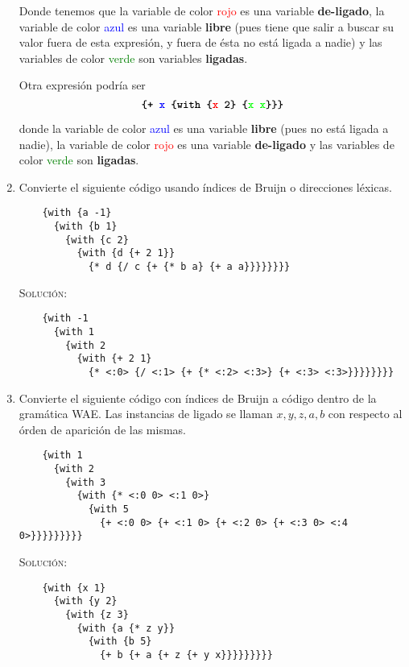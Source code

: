 \documentclass[letterpaper,11pt]{article}
\begin{document}
\begin{enumerate}
    Donde tenemos que la variable de color \textcolor{red}{rojo} es una variable 
    \textbf{de-ligado}, la variable de color \textcolor{blue}{azul} es una
    variable \textbf{libre} (pues tiene que salir a buscar su valor fuera de 
    esta expresión, y fuera de ésta no está ligada a nadie) y las variables de 
    color \textcolor{green}{verde} son  
    variables \textbf{ligadas}. 

    Otra expresión podría ser 
    \begin{equation*}
        \texttt{\textbf{\{+ \textcolor{blue}{x} 
                            \{with \{\textcolor{red}{x} 2\} 
                                   \{\textcolor{green}{x} 
                                     \textcolor{green}{x}\}\}\}}}
    \end{equation*}

    donde la variable de color \textcolor{blue}{azul} es una variable 
    \textbf{libre} (pues no está ligada a nadie), la variable de color 
    \textcolor{red}{rojo} es una variable \textbf{de-ligado} y las 
    variables de color \textcolor{green}{verde} son \textbf{ligadas}.

    \newpage
    \item Convierte el siguiente código usando índices de Bruijn o direcciones
    léxicas. 
    \begin{verbatim}
    {with {a -1} 
      {with {b 1} 
        {with {c 2} 
          {with {d {+ 2 1}} 
            {* d {/ c {+ {* b a} {+ a a}}}}}}}}
    \end{verbatim}

    \textsc{Solución:}
    \begin{verbatim}
    {with -1 
      {with 1 
        {with 2 
          {with {+ 2 1} 
            {* <:0> {/ <:1> {+ {* <:2> <:3>} {+ <:3> <:3>}}}}}}}}
    \end{verbatim}

    \item Convierte el siguiente código con índices de Bruijn a código dentro 
    de la gramática WAE. Las instancias de ligado se llaman $x, y, z, a, b$ con 
    respecto al órden de aparición de las mismas. 
    \begin{verbatim}
    {with 1 
      {with 2
        {with 3
          {with {* <:0 0> <:1 0>} 
            {with 5
              {+ <:0 0> {+ <:1 0> {+ <:2 0> {+ <:3 0> <:4 0>}}}}}}}}}
    \end{verbatim}

    \textsc{Solución:}
    \begin{verbatim}
    {with {x 1} 
      {with {y 2} 
        {with {z 3} 
          {with {a {* z y}} 
            {with {b 5} 
              {+ b {+ a {+ z {+ y x}}}}}}}}}
    \end{verbatim}


\end{enumerate}
\end{document}
